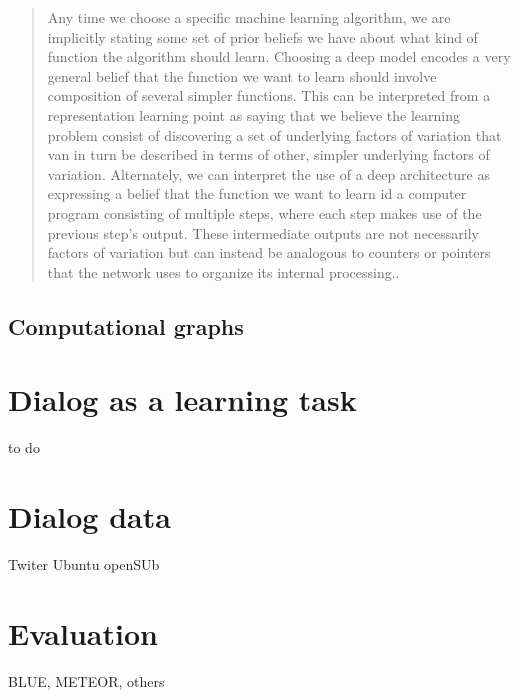 \begin{quote}
Any time we choose a specific machine learning algorithm, we are implicitly stating some set of prior beliefs we have about what kind of function the algorithm should learn. Choosing a deep model encodes a very general belief that the function we want to learn should involve composition of several simpler functions. This can be interpreted from a representation learning point as saying that we believe the learning problem consist of discovering a set of underlying factors of variation that van in turn be described in terms of other, simpler underlying factors of variation. Alternately, we can interpret  the use of a deep architecture as expressing a belief that the function we want to learn id a computer program consisting of multiple steps, where each step makes use of the previous step's output. These intermediate outputs are not necessarily factors of variation but can instead be analogous to counters or pointers that the network uses to organize its internal processing.\cite[p.~195]{DeepLearningbook}.
\end{quote}


\subsection{Computational graphs}


\section{Dialog as a learning task}

to do 

\section{Dialog data}

Twiter Ubuntu openSUb

\section{Evaluation}

BLUE, METEOR, others 